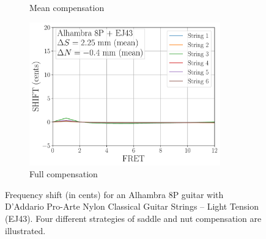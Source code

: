 \begin{figure}
\begin{subfigure}[b]{0.45\textwidth}
   \caption{Mean compensation}
   \label{fig:shift_alhambra8p_ej43_mean}
  \end{subfigure}
  \hspace{0.25in}
  \begin{subfigure}[b]{0.45\textwidth}
   \centering
   \includegraphics[width=3.25in]{figures/shift_alhambra8p_ej43_full}
   \caption{Full compensation}
   \label{fig:shift_alhambra8p_ej43_full}
  \end{subfigure}
  \caption{\label{fig:compensation} Frequency shift (in cents) for an Alhambra 8P guitar with D'Addario Pro-Arte Nylon Classical Guitar Strings -- Light Tension (EJ43). Four different strategies of saddle and nut compensation are illustrated.}
 \end{figure}




